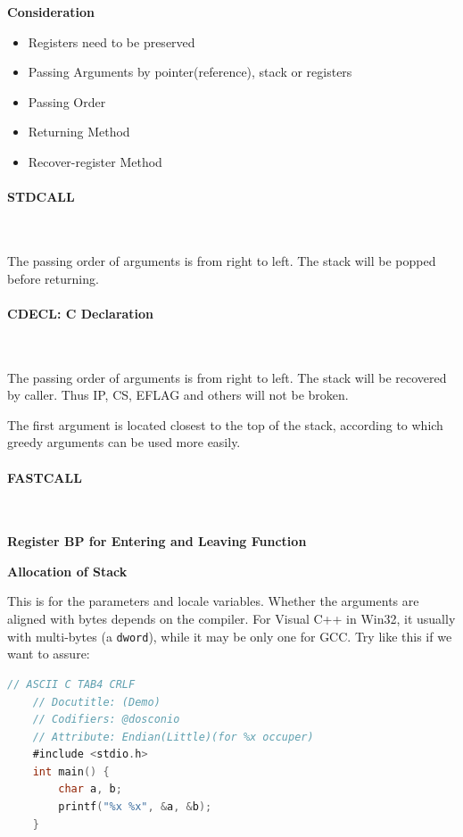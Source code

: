 \textbf{Consideration}

\begin{itemize}

\item Registers need to be preserved
\item Passing Arguments by pointer(reference), stack or registers
\item Passing Order
\item Returning Method
\item Recover-register Method
\end{itemize}



\paragraph{STDCALL} \

The passing order of arguments is from right to left. The stack will be popped before returning.



\paragraph{CDECL: C Declaration} \

The passing order of arguments is from right to left. The stack will be recovered by caller. Thus IP, CS, EFLAG and others will not be broken.

The first argument is located closest to the top of the stack, according to which greedy arguments can be used more easily.



\paragraph{FASTCALL} \

\textbf{Register BP for Entering and Leaving Function}

\textbf{Allocation of Stack}

This is for the parameters and locale variables. Whether the arguments are aligned with bytes depends on the compiler. For Visual C++ in Win32, it usually with multi-bytes (a \verb|dword|), while it may be only one for GCC. Try like this if we want to assure:

\lstset{style=GlobalC}
\begin{lstlisting}[language=C]
	// ASCII C TAB4 CRLF
	// Docutitle: (Demo) 
	// Codifiers: @dosconio
	// Attribute: Endian(Little)(for %x occuper)
	#include <stdio.h>
	int main() {
		char a, b;
		printf("%x %x", &a, &b);
	}
\end{lstlisting}



